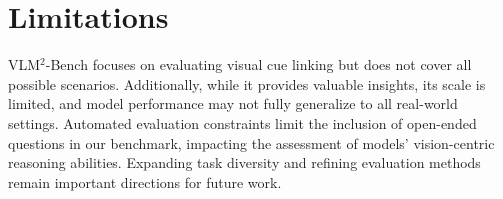 \section*{Limitations}
VLM$^2$-Bench focuses on evaluating visual cue linking but does not cover all possible scenarios. Additionally, while it provides valuable insights, its scale is limited, and model performance may not fully generalize to all real-world settings. Automated evaluation constraints limit the inclusion of open-ended questions in our benchmark, impacting the assessment of models' vision-centric reasoning abilities. Expanding task diversity and refining evaluation methods remain important directions for future work.



